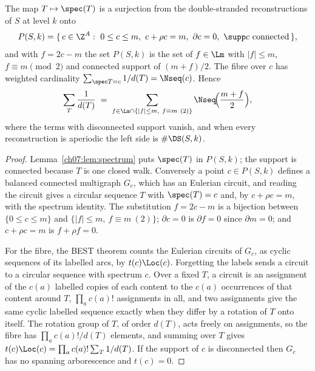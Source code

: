 \begin{theorem}\label{ch07:thm:lattice}
The map $T\mapsto\spec(T)$ is a surjection from the double-stranded reconstructions of $S$ at
level $k$ onto
\[
  P(S,k)=\{\,c\in\Z^A:\ 0\le c\le m,\ c+\rho c=m,\ \partial c=0,\ \supp c \text{ connected}\,\},
\]
and with $f=2c-m$ the set $P(S,k)$ is the set of $f\in\Lm$ with $|f|\le m$, $f\equiv m
\pmod 2$ and connected support of $(m+f)/2$. The fibre over $c$ has weighted cardinality
$\sum_{\spec T=c}1/d(T)=\Nseq(c)$. Hence
\[
  \sum_{T}\frac1{d(T)}\;=\;\sum_{f\in\Lm\cap\{|f|\le m,\ f\equiv m\ (2)\}}
  \Nseq\!\Big(\frac{m+f}{2}\Big),
\]
where the terms with disconnected support vanish, and when every reconstruction is aperiodic
the left side is $\#\DS(S,k)$.
\end{theorem}

\begin{proof}
Lemma~\ref{ch07:lem:spectrum} puts $\spec(T)$ in $P(S,k)$; the support is connected because $T$ is
one closed walk. Conversely a point $c\in P(S,k)$ defines a balanced connected multigraph
$G_c$, which has an Eulerian circuit, and reading the circuit gives a circular sequence $T$
with $\spec(T)=c$ and, by $c+\rho c=m$, with the spectrum identity. The substitution $f=2c-m$
is a bijection between $\{0\le c\le m\}$ and $\{|f|\le m,\ f\equiv m\ (2)\}$; $\partial c=0$
is $\partial f=0$ since $\partial m=0$; and $c+\rho c=m$ is $f+\rho f=0$.

For the fibre, the BEST theorem \cite{BEST,SmithTutte} counts the Eulerian circuits of
$G_c$, as cyclic sequences of its labelled arcs, by $t(c)\Loc(c)$. Forgetting the labels
sends a circuit to a circular sequence with spectrum $c$. Over a fixed $T$, a circuit is an
assignment of the $c(a)$ labelled copies of each content to the $c(a)$ occurrences of that
content around $T$, $\prod_a c(a)!$ assignments in all, and two assignments give the same
cyclic labelled sequence exactly when they differ by a rotation of $T$ onto itself. The
rotation group of $T$, of order $d(T)$, acts freely on assignments, so the fibre has
$\prod_a c(a)!/d(T)$ elements, and summing over $T$ gives
$t(c)\Loc(c)=\prod_a c(a)!\sum_T 1/d(T)$. If the support of $c$ is disconnected then $G_c$
has no spanning arborescence and $t(c)=0$.
\end{proof}

